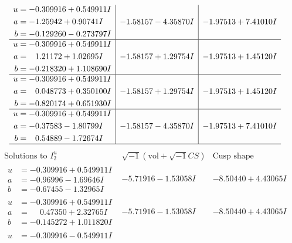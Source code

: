 \documentclass[1p]{elsarticle_modified}
\theoremstyle{definition}
\newcommand{\I}{\sqrt{-1}}
\begin{document}
$$\begin{array}{c|c|c}
\begin{aligned}
u &= -0.309916 + 0.549911 I \\
a &= -1.25942 + 0.90741 I \\
b &= -0.129260 - 0.273797 I\end{aligned}
 & -1.58157 - 4.35870 I & -1.97513 + 7.41010 I \\ \hline\begin{aligned}
u &= -0.309916 + 0.549911 I \\
a &= \phantom{-}1.21172 + 1.02695 I \\
b &= -0.218320 + 1.108690 I\end{aligned}
 & -1.58157 + 1.29754 I & -1.97513 + 1.45120 I \\ \hline\begin{aligned}
u &= -0.309916 + 0.549911 I \\
a &= \phantom{-}0.048773 + 0.350100 I \\
b &= -0.820174 + 0.651930 I\end{aligned}
 & -1.58157 + 1.29754 I & -1.97513 + 1.45120 I \\ \hline\begin{aligned}
u &= -0.309916 + 0.549911 I \\
a &= -0.37583 - 1.80799 I \\
b &= \phantom{-}0.54889 - 1.72674 I\end{aligned}
 & -1.58157 - 4.35870 I & -1.97513 + 7.41010 I\\
 \hline 
 \end{array}$$\newpage$$\begin{array}{c|c|c}  
\text{Solutions to }I^u_{2}& \I (\text{vol} + \sqrt{-1}CS) & \text{Cusp shape}\\
 \hline 
\begin{aligned}
u &= -0.309916 + 0.549911 I \\
a &= -0.96996 - 1.69646 I \\
b &= -0.67455 - 1.32965 I\end{aligned}
 & -5.71916 - 1.53058 I & -8.50440 + 4.43065 I \\ \hline\begin{aligned}
u &= -0.309916 + 0.549911 I \\
a &= \phantom{-}0.47350 + 2.32765 I \\
b &= -0.145272 + 1.011820 I\end{aligned}
 & -5.71916 - 1.53058 I & -8.50440 + 4.43065 I \\ \hline\begin{aligned}
u &= -0.309916 - 0.549911 I \\

\end{aligned}
\end{array}$$
\end{document}
